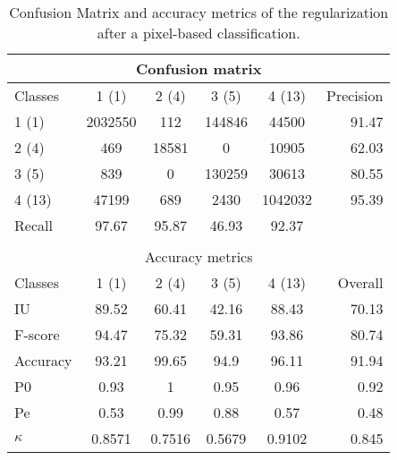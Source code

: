 \begin{table}[H]
\begin{center}
\footnotesize
\begin{tabular}{|l|c|c|c|c|r|}
\hline
\multicolumn{6}{|c|}{Confusion matrix} \\
\hline
 Classes & 1 (1) & 2 (4) & 3 (5) & 4 (13) & Precision \\
\hline
1 (1) & 2032550 & 112 & 144846 & 44500 & 91.47 \\
\hline
2 (4) & 469 & 18581 & 0 & 10905 & 62.03 \\
\hline
3 (5) & 839 & 0 & 130259 & 30613 & 80.55 \\
\hline
4 (13) & 47199 & 689 & 2430 & 1042032 & 95.39 \\
\hline
Recall & 97.67 & 95.87 & 46.93 & 92.37 &  \\
\hline
\multicolumn{6}{c}{ } \\
\hline
\multicolumn{6}{|c|}{Accuracy metrics} \\
\hline
 Classes & 1 (1) & 2 (4) & 3 (5) & 4 (13) & Overall \\
\hline
IU & 89.52 & 60.41 & 42.16 & 88.43 & 70.13 \\
\hline
F-score & 94.47 & 75.32 & 59.31 & 93.86 & 80.74 \\
\hline
Accuracy & 93.21 & 99.65 & 94.9 & 96.11 & 91.94 \\
\hline
P0 & 0.93 & 1 & 0.95 & 0.96 & 0.92 \\
\hline
Pe & 0.53 & 0.99 & 0.88 & 0.57 & 0.48 \\
\hline
$\kappa$ & 0.8571 & 0.7516 & 0.5679 & 0.9102 & 0.845 \\
\hline
\end{tabular}
\caption{Confusion Matrix and accuracy metrics of the regularization after a pixel-based classification.}
\label{table:C3_S3_ss3_regul_pixel}
\end{center}
\end{table}